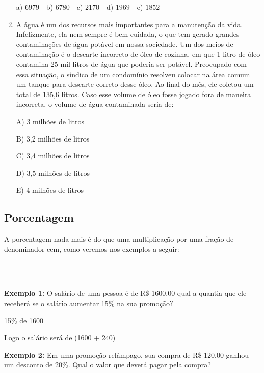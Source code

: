 \begin{multicols*}{2}
\begin{enumerate}
		a) $6979 \ \ \ $ b) $6780 \ \ \ $ c) $2170 \ \ \ $ d) $1969 \ \ \ $ e) $1852 \ \ $

			\item A água é um dos recursos mais importantes para a manutenção da vida. Infelizmente, ela nem sempre é bem cuidada, o que tem gerado grandes contaminações de água potável em nossa sociedade. Um dos meios de contaminação é o descarte incorreto de óleo de cozinha, em que 1 litro de óleo contamina 25 mil litros de água que poderia ser potável. Preocupado com essa situação, o síndico de um condomínio resolveu colocar na área comum um tanque para descarte correto desse  óleo. Ao final do mês, ele coletou um total de 135,6 litros. Caso esse volume de óleo fosse jogado fora de maneira incorreta, o volume de água contaminada seria de:

A) 3 milhões de litros

B) 3,2 milhões de litros

C) 3,4 milhões de litros

D) 3,5 milhões de litros

E) 4 milhões de litros
			
			\end{enumerate}

        \subsection*{Porcentagem}
        
A porcentagem nada mais é do que uma multiplicação por uma fração de denominador cem, como veremos nos exemplos a seguir:

\\

\\


		\textbf{Exemplo 1:} O salário de uma pessoa é de R\$ 1600,00 qual a quantia que ele receberá se o salário aumentar 15\% na sua promoção?
		
		15\% de 1600  =  

		Logo o salário será de (1600 + 240) = 
		
		\textbf{Exemplo 2:} Em uma promoção relâmpago, sua compra de R\$ 120,00 ganhou um desconto de 20\%. Qual o valor que deverá pagar pela compra?
		

\end{multicols*}
